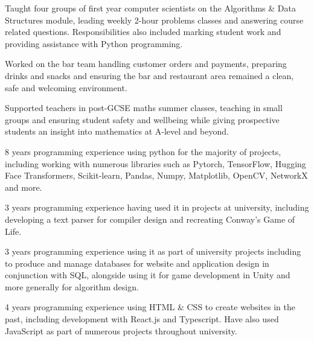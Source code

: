 \documentclass[9pt,a4paper,ragged2e,withhyper]{altacv}
\begin{document}
\begin{paracol}{2}
\medskip


Taught four groups of first year computer scientists on the Algorithms \& Data Structures module, leading weekly 2-hour problems classes and answering course related questions. Responsibilities also included marking student work and providing assistance with Python programming.

\medskip

Worked on the bar team handling customer orders and payments, preparing drinks and snacks and ensuring the bar and restaurant area remained a clean, safe and welcoming environment.

\medskip

Supported teachers in post-GCSE maths summer classes, teaching in small groups and ensuring student safety and wellbeing while giving prospective students an insight into mathematics at A-level and beyond.



\switchcolumn


8 years programming experience using python for the majority of projects, including working with numerous libraries such as Pytorch, TensorFlow, Hugging Face Transformers, Scikit-learn, Pandas, Numpy, Matplotlib, OpenCV, NetworkX and more.

\medskip

3 years programming experience having used it in projects at university, including developing a text parser for compiler design and recreating Conway's Game of Life.

\medskip

3 years programming experience using it as part of university projects including to produce and manage databases for website and application design in conjunction with SQL, alongside using it for game development in Unity and more generally for algorithm design.

\medskip

4 years programming experience using HTML \& CSS to create websites in the past, including development with React.js and Typescript. Have also used JavaScript as part of numerous projects throughout university.


\end{paracol}
\end{document}
